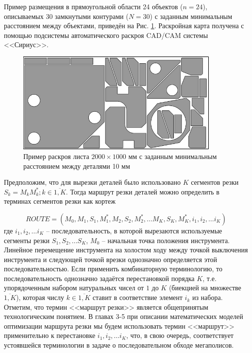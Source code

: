 \documentclass[11pt,twoside]{report}
\begin{document}
Пример размещения в прямоугольной области 24 объектов
($n=24$),
описываемых 30 замкнутыми контурами
($N=30$)
с заданным минимальным расстоянием между объектами,
приведён на Рис. \ref{nesting}.
Раскройная карта получена с
помощью подсистемы автоматического раскроя CAD/CAM системы <<Сириус>>.

\begin{figure}
  \begin{center}
  \includegraphics[width=0.9\textwidth]{nesting.png}
  \caption{Пример раскроя листа $2000 \times 1000$ мм с заданным минимальным расстоянием между деталями 10 мм}
  \label{nesting}
  \end{center}
\end{figure}

Предположим, что для вырезки деталей было использовано
$K$
сегментов резки
$S_k=M_kM^*_k; k \in \overline{1,K}$.
Тогда маршрут резки деталей можно определить
в терминах сегментов резки как кортеж

\begin{equation}
  ROUTE = (
    M_0, M_1, S_1, M_1^*, M_2, S_2, M_2^*, \dots M_K, S_K, M_K^*, i_1, i_2, \dots i_K
  )
  \label{tuple}
\end{equation}
где
$i_1, i_2, \dots i_K$
– последовательность, в которой вырезаются используемые сегменты резки
$S_1, S_2, \dots S_K$,
$M_0$
– начальная точка положения инструмента.
Линейное перемещение инструмента на холостом ходу
между точкой выключения инструмента и следующей точкой врезки
однозначно определяется этой последовательностью.
Если применить комбинаторную терминологию,
то последовательность однозначно задаётся перестановкой порядка
$K$,
т.е. упорядоченным набором натуральных чисел от $1$ до $K$
(биекцией на множестве $\overline{1,K}$),
которая числу
$k \in \overline{1,K}$
ставит в соответствие элемент
$i_k$ из набора.
Отметим, что термин <<маршрут резки>> является
общепринятым технологическим понятием.
В главах 3-5 при описании математических моделей оптимизации
маршрута резки мы будем использовать термин <<маршрут>>
применительно к перестановке
$i_1, i_2, \dots i_K$,
что, в свою очередь, соответствует устоявшейся
терминологии в задаче о последовательном обходе мегаполисов.
\end{document}
